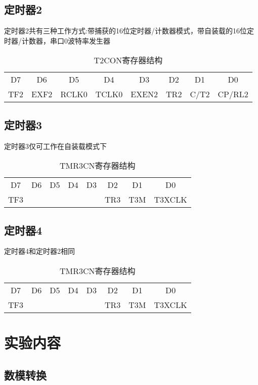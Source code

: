 \documentclass{article}
\begin{document}
\begin{CJK}{UTF8}{gkai}
\subsection{定时器2}
定时器2共有三种工作方式:带捕获的16位定时器/计数器模式，带自装载的16位定时器/计数器，串口0波特率发生器
\begin{table}[!htbp]
  \centering
  \caption{T2CON寄存器结构}
  \begin{tabular}{|c|c|c|c|c|c|c|c|}
    \hline
    D7&D6&D5&D4&D3&D2&D1&D0\\
    TF2&EXF2&RCLK0&TCLK0&EXEN2&TR2&C/T2&CP/RL2\\
    \hline
  \end{tabular}

\end{table}

\subsection{定时器3}
定时器3仅可工作在自装载模式下
\begin{table}[!htbp]
  \centering
  \caption{TMR3CN寄存器结构}
  \begin{tabular}{|c|c|c|c|c|c|c|c|}
    \hline
    D7&D6&D5&D4&D3&D2&D1&D0\\
    TF3&&&&&TR3&T3M&T3XCLK\\
    \hline
  \end{tabular}

\end{table}

\subsection{定时器4}
定时器4和定时器2相同
\begin{table}[!htbp]
  \centering
  \caption{TMR3CN寄存器结构}
  \begin{tabular}{|c|c|c|c|c|c|c|c|}
    \hline
    D7&D6&D5&D4&D3&D2&D1&D0\\
    TF3&&&&&TR3&T3M&T3XCLK\\
    \hline
  \end{tabular}

\end{table}
\section{实验内容}
\subsection{数模转换}


\end{CJK}
\end{document}
